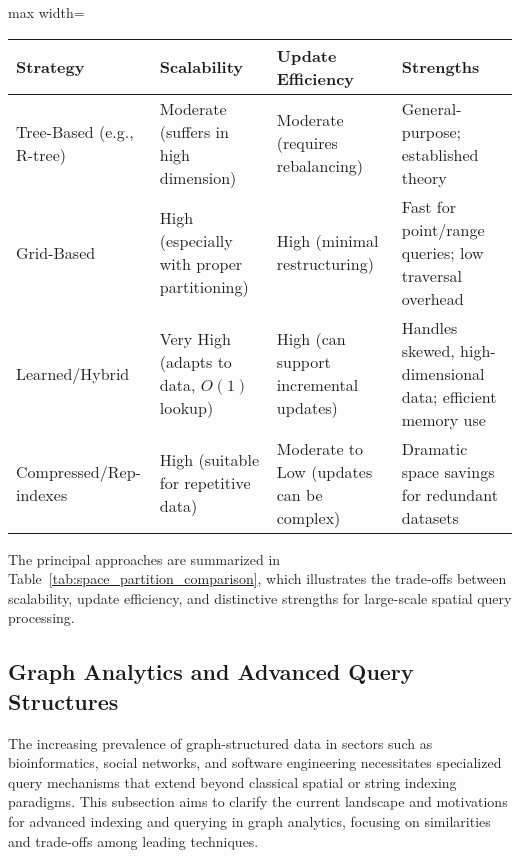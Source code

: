 \documentclass[sigconf]{acmart}
\begin{document}
\begin{table*}[htbp]
\centering
\caption{Comparison of Space-Partitioning Index Strategies for Large-Scale Query Processing}
\label{tab:space_partition_comparison}
\begin{adjustbox}{max width=\textwidth}
\begin{tabular}{@{}llll@{}}
\toprule
\textbf{Strategy} & \textbf{Scalability} & \textbf{Update Efficiency} & \textbf{Strengths} \\
\midrule
Tree-Based (e.g., R-tree) & Moderate (suffers in high dimension) & Moderate (requires rebalancing) & General-purpose; established theory \\
Grid-Based & High (especially with proper partitioning) & High (minimal restructuring) & Fast for point/range queries; low traversal overhead \\
Learned/Hybrid & Very High (adapts to data, $O(1)$ lookup) & High (can support incremental updates) & Handles skewed, high-dimensional data; efficient memory use \\
Compressed/Rep-indexes & High (suitable for repetitive data) & Moderate to Low (updates can be complex) & Dramatic space savings for redundant datasets \\
\bottomrule
\end{tabular}
\end{adjustbox}
\end{table*}

The principal approaches are summarized in Table~\ref{tab:space_partition_comparison}, which illustrates the trade-offs between scalability, update efficiency, and distinctive strengths for large-scale spatial query processing.

\subsection{Graph Analytics and Advanced Query Structures}

The increasing prevalence of graph-structured data in sectors such as bioinformatics, social networks, and software engineering necessitates specialized query mechanisms that extend beyond classical spatial or string indexing paradigms. This subsection aims to clarify the current landscape and motivations for advanced indexing and querying in graph analytics, focusing on similarities and trade-offs among leading techniques.
\end{document}
